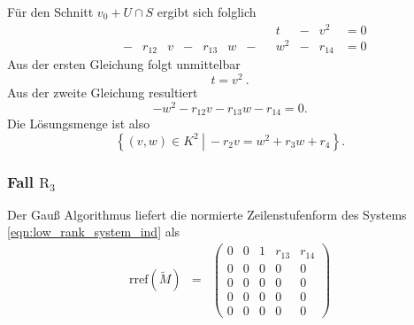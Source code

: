 \documentclass[a4paper,oneside, 11pt, openany%
]{article}
\theoremstyle{custom}
\theoremstyle{custom}
\begin{document}
Für den Schnitt $v_0 + U \cap S $ ergibt sich folglich
\begin{equation*}
	\begin{alignedat}{14}
		&&&&&&&&&&&t&-&v^2&= 0\\
		&&&-&r_{12}&v&-&r_{13}&w&-&&w^2&-&r_{14}&=0
	\end{alignedat}
\end{equation*}
Aus der ersten Gleichung folgt unmittelbar
\begin{equation*}
	t = v^2\ .
\end{equation*}
Aus der zweite Gleichung resultiert
\begin{equation*}
	-w^2 - r_{12} v - r_{13}w - r_{14} = 0.
\end{equation*}
Die Lösungsmenge ist also 
\begin{equation*}
	\left\lbrace (v,w) \in K^2 \ \left| \  -r_{2} v = w^2 +r_{3}w + r_{4}\right.\right\rbrace.
\end{equation*}
\subsubsection*{Fall $\text{R}_{3}$}
Der Gauß Algorithmus liefert die normierte Zeilenstufenform des Systems \eqref{eqn:low_rank_system_ind} als
\begin{equation*}\label{eqn:rref_r3}
	\begin{alignedat}{-1}
		\text{rref}(\tilde{M}) &=& 
		\left( \begin{array}{ccccc}				
			0&0&1&r_{13}&r_{14}\\
			0&0&0&0&0\\
			0&0&0&0&0\\
			0&0&0&0&0\\
			0&0&0&0&0
		\end{array}
		\right)
	\end{alignedat}
\end{equation*}
\end{document}

